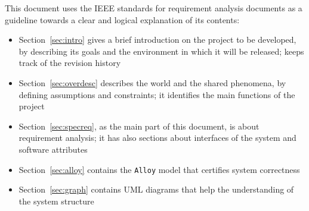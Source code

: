     This document uses the IEEE standards for requirement analysis documents \cite{ieee830} as a guideline towards a clear and logical explanation of its contents:
    \begin{itemize}
      \item Section~\ref{sec:intro} gives a brief introduction on the project to be developed, by describing its goals and the environment in which it will be released; keeps track of the revision history
      \item Section~\ref{sec:overdesc} describes the world and the shared phenomena, by defining assumptions and constraints; it identifies the main functions of the project
      \item Section~\ref{sec:specreq}, as the main part of this document, is about requirement analysis; it has also sections about interfaces of the system and software attributes
      \item Section~\ref{sec:alloy} contains the \texttt{Alloy} model that certifies system correctness
      \item Section~\ref{sec:graph} contains UML diagrams that help the understanding of the system structure
    \end{itemize}
